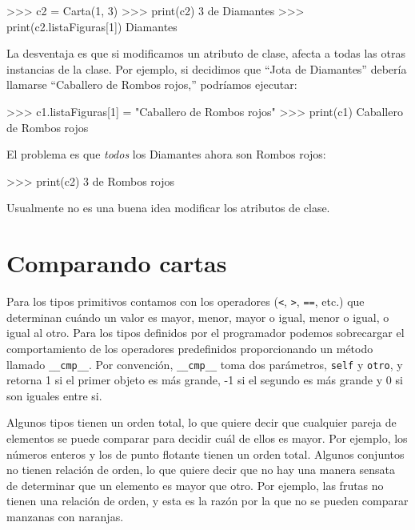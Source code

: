 \begin{pyconcode}
>>> c2 = Carta(1, 3)
>>> print(c2)
3 de Diamantes
>>> print(c2.listaFiguras[1])
Diamantes
\end{pyconcode}
 La desventaja es que si modificamos un atributo de clase, afecta
a todas las otras instancias de la clase. Por ejemplo, si decidimos
que ``Jota de Diamantes'' debería llamarse ``Caballero de Rombos
rojos,'' podríamos ejecutar:

 

\begin{pyconcode}
>>> c1.listaFiguras[1] = "Caballero de Rombos rojos"
>>> print(c1)
Caballero de Rombos rojos
\end{pyconcode}
 El problema es que {\em todos} los Diamantes ahora son Rombos
rojos:

\begin{pyconcode}
>>> print(c2)
3 de Rombos rojos
\end{pyconcode}
 Usualmente no es una buena idea modificar los atributos de clase.

\section{Comparando cartas}

\label{comparecard}  

Para los tipos primitivos contamos con los operadores (\texttt{<},
\texttt{>}, \texttt{==}, etc.) que determinan cuándo un valor es mayor,
menor, mayor o igual, menor o igual, o igual al otro. Para los tipos
definidos por el programador podemos sobrecargar el comportamiento
de los operadores predefinidos proporcionando un método llamado \texttt{\_\_cmp\_\_}.
Por convención, \texttt{\_\_cmp\_\_} toma dos parámetros, \texttt{self}
y \texttt{otro}, y retorna 1 si el primer objeto es más grande, -1
si el segundo es más grande y 0 si son iguales entre si.

  
 

Algunos tipos tienen un orden total, lo que quiere decir que cualquier
pareja de elementos se puede comparar para decidir cuál de ellos es
mayor. Por ejemplo, los números enteros y los de punto flotante tienen
un orden total. Algunos conjuntos no tienen relación de orden, lo
que quiere decir que no hay una manera sensata de determinar que un
elemento es mayor que otro. Por ejemplo, las frutas no tienen una
relación de orden, y esta es la razón por la que no se pueden comparar
manzanas con naranjas.

